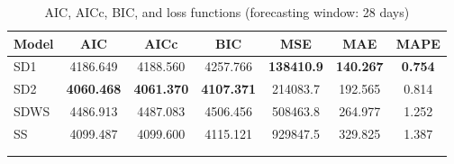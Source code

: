 \begin{table}[h!]
\centering
\caption{AIC, AICc, BIC, and loss functions (forecasting window: 28 days)}
\centering
\renewcommand{\arraystretch}{1.5}
\begin{tabular}[h]{l c c c c c c}
\hline
\textbf{Model} & \textbf{AIC} & \textbf{AICc} & \textbf{BIC} & \textbf{MSE} & \textbf{MAE} & \textbf{MAPE}\\
\hline
SD1 & 4186.649 & 4188.560 & 4257.766 & \textbf{138410.9} & \textbf{140.267} & \textbf{0.754}\\
SD2 & \textbf{4060.468} & \textbf{4061.370} & \textbf{4107.371} & 214083.7 & 192.565 & 0.814\\
SDWS & 4486.913 & 4487.083 & 4506.456 & 508463.8 & 264.977 & 1.252\\
SS & 4099.487 & 4099.600 & 4115.121 & 929847.5 & 329.825 & 1.387\\
\hline \\
& & & & & & \\
\end{tabular}
\label{tab:28d}
\end{table}
